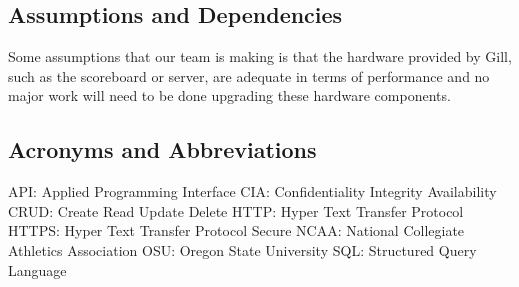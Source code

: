 \documentclass[letterpaper,10pt,draftclsnofoot,onecolumn,]{article}
\begin{document}
\subsection{Assumptions and Dependencies}
Some assumptions that our team is making is that the hardware provided by Gill, such as the scoreboard or server, are adequate in terms of performance and no major work will need to be done upgrading these hardware components.

\subsection{Acronyms and Abbreviations}
API: Applied Programming Interface\newline
CIA: Confidentiality Integrity Availability\newline
CRUD: Create Read Update Delete\newline
HTTP: Hyper Text Transfer Protocol\newline
HTTPS: Hyper Text Transfer Protocol Secure\newline
NCAA: National Collegiate Athletics Association\newline
OSU: Oregon State University\newline
SQL: Structured Query Language\newline
\end{document}
